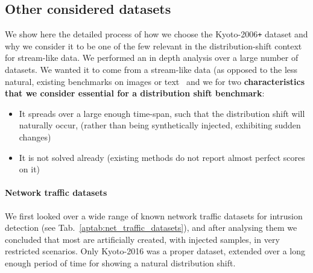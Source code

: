 \documentclass{article}
\begin{document}
\subsection{Other considered datasets}
\label{appendix:other_datasets}
We show here the detailed process of how we choose the Kyoto-2006\texttt{+} dataset and why we consider it to be one of the few relevant in the distribution-shift context for stream-like data. We performed an in depth analysis over a large number of datasets. We wanted it to come from a stream-like data (as opposed to the less natural, existing benchmarks on images or text~\cite{clear, mind_the_gap, shift_auto_drive, intel_cl_benck, wilds} and we for two \textbf{characteristics that we consider essential for a distribution shift benchmark}:
\begin{itemize}
    \item It spreads over a large enough time-span, such that the distribution shift will naturally occur, (rather than being synthetically injected, exhibiting sudden changes)
    \item It is not solved already (existing methods do not report almost perfect scores on it)
\end{itemize}

\paragraph{Network traffic datasets}
We first looked over a wide range of known network traffic datasets for intrusion detection (see Tab.~\ref{aptab:net_traffic_datasets}), and after analysing them we concluded that most are artificially created, with injected samples, in very restricted scenarios. Only Kyoto-2016 was a proper dataset, extended over a long enough period of time for showing a natural distribution shift.
\end{document}
